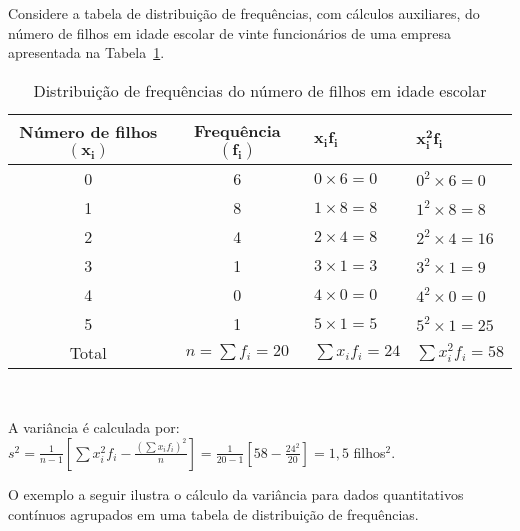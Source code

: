 \documentclass[11pt,fleqn]{book} %
\begin{document}
\begin{example}

Considere a tabela de distribuição de frequências, com cálculos auxiliares, do número de filhos em idade escolar de vinte funcionários de uma empresa  apresentada na Tabela~\ref{tab:numerodefilhos}.


\begin{table}[h]
	\caption{Distribuição de frequências do número de filhos em idade escolar}
	\label{tab:numerodefilhos} 
	\vspace{-0.1cm}
	\centering
	\begin{tabular}{c c l l}
	\toprule
	\textbf{Número de filhos $\bm{(x_i)}$} & \textbf{Frequência $\bm{(f_i)}$} & $\bm{x_i f_i}$ & $\bm{x_i^2 f_i}$ \\
	\midrule
	0 & 6 & $0 \times 6 = 0$ & $0^2 \times 6 = 0$ \\
	1 & 8 & $1 \times 8 = 8$ & $1^2 \times 8 = 8$ \\
	2 & 4 & $2 \times 4 = 8$ & $2^2 \times 4 = 16$ \\
	3 & 1 & $3 \times 1 = 3$ & $3^2 \times 1 = 9$ \\
	4 & 0 & $4 \times 0 = 0$ & $4^2 \times 0 = 0$ \\
	5 & 1 & $5 \times 1 = 5$ & $5^2 \times 1 = 25$ \\
	\hline
	Total & $n=\sum f_i=20$ & $\sum x_i f_i=24$ & $\sum x_i^2 f_i=58$ \\
	\bottomrule
	\end{tabular} \\
\end{table}

A variância é calculada por: \\

$\displaystyle s^2=\frac{1}{n-1}\left[\sum{x_i^2 f_i}-\frac{(\sum x_i f_i)^2}{n}\right]
=\frac{1}{20-1}\left[58-\frac{24^2}{20}\right]
=1,5$ filhos$^2$. 


\end{example}

\vspace{0,3cm}

O exemplo a seguir ilustra o cálculo da variância para dados quantitativos contínuos agrupados em uma tabela de distribuição de frequências. \\

\end{document}
